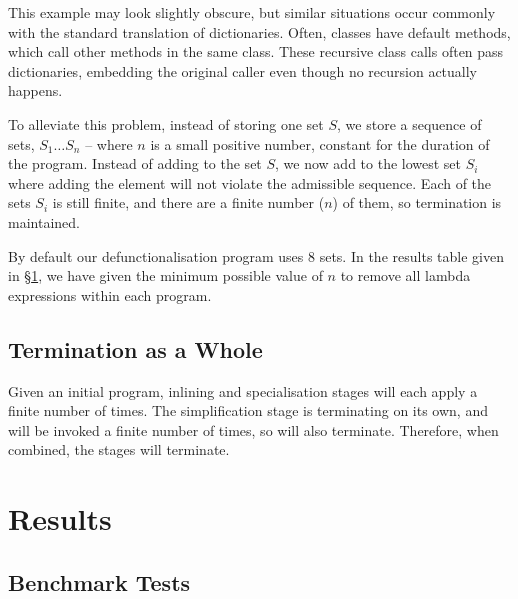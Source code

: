 \documentclass[preprint]{sigplanconf}
\begin{document}
This example may look slightly obscure, but similar situations occur commonly with the standard translation of dictionaries. Often, classes have default methods, which call other methods in the same class. These recursive class calls often pass dictionaries, embedding the original caller even though no recursion actually happens.

To alleviate this problem, instead of storing one set $S$, we store a sequence of sets, $S_1 \ldots S_n$ -- where $n$ is a small positive number, constant for the duration of the program. Instead of adding to the set $S$, we now add to the lowest set $S_i$ where adding the element will not violate the admissible sequence. Each of the sets $S_i$ is still finite, and there are a finite number ($n$) of them, so termination is maintained.

By default our defunctionalisation program uses 8 sets. In the results table given in \S\ref{sec:results}, we have given the minimum possible value of $n$ to remove all lambda expressions within each program.

\subsection{Termination as a Whole}

Given an initial program, inlining and specialisation stages will each apply a finite number of times. The simplification stage is terminating on its own, and will be invoked a finite number of times, so will also terminate. Therefore, when combined, the stages will terminate.

\section{Results}
\label{sec:results}

\subsection{Benchmark Tests}
\end{document}
